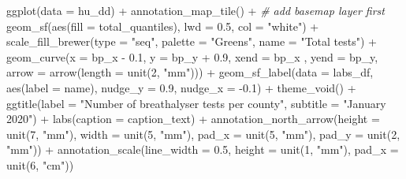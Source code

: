 \documentclass[
]{book}
\newenvironment{Shaded}{\begin{snugshade}}{\end{snugshade}}
\newcommand{\AttributeTok}[1]{\textcolor[rgb]{0.77,0.63,0.00}{#1}}
\newcommand{\CommentTok}[1]{\textcolor[rgb]{0.56,0.35,0.01}{\textit{#1}}}
\newcommand{\DecValTok}[1]{\textcolor[rgb]{0.00,0.00,0.81}{#1}}
\newcommand{\FloatTok}[1]{\textcolor[rgb]{0.00,0.00,0.81}{#1}}
\newcommand{\FunctionTok}[1]{\textcolor[rgb]{0.00,0.00,0.00}{#1}}
\newcommand{\NormalTok}[1]{#1}
\newcommand{\SpecialCharTok}[1]{\textcolor[rgb]{0.00,0.00,0.00}{#1}}
\newcommand{\StringTok}[1]{\textcolor[rgb]{0.31,0.60,0.02}{#1}}
\begin{document}
\begin{Shaded}
\begin{Highlighting}[]
\FunctionTok{ggplot}\NormalTok{(}\AttributeTok{data =}\NormalTok{ hu\_dd) }\SpecialCharTok{+} 
  \FunctionTok{annotation\_map\_tile}\NormalTok{() }\SpecialCharTok{+}  \CommentTok{\# add basemap layer first}
  \FunctionTok{geom\_sf}\NormalTok{(}\FunctionTok{aes}\NormalTok{(}\AttributeTok{fill =}\NormalTok{ total\_quantiles), }
          \AttributeTok{lwd =} \FloatTok{0.5}\NormalTok{, }\AttributeTok{col =} \StringTok{"white"}\NormalTok{) }\SpecialCharTok{+} 
  \FunctionTok{scale\_fill\_brewer}\NormalTok{(}\AttributeTok{type =} \StringTok{"seq"}\NormalTok{, }
                    \AttributeTok{palette =} \StringTok{"Greens"}\NormalTok{, }
                    \AttributeTok{name =} \StringTok{"Total tests"}\NormalTok{) }\SpecialCharTok{+} 
  \FunctionTok{geom\_curve}\NormalTok{(}\AttributeTok{x =}\NormalTok{ bp\_x }\SpecialCharTok{{-}} \FloatTok{0.1}\NormalTok{, }
             \AttributeTok{y =}\NormalTok{ bp\_y }\SpecialCharTok{+} \FloatTok{0.9}\NormalTok{, }
             \AttributeTok{xend =}\NormalTok{ bp\_x , }
             \AttributeTok{yend =}\NormalTok{ bp\_y, }
             \AttributeTok{arrow =} \FunctionTok{arrow}\NormalTok{(}\AttributeTok{length =} \FunctionTok{unit}\NormalTok{(}\DecValTok{2}\NormalTok{, }\StringTok{"mm"}\NormalTok{))) }\SpecialCharTok{+}
  \FunctionTok{geom\_sf\_label}\NormalTok{(}\AttributeTok{data =}\NormalTok{ labs\_df, }
                \FunctionTok{aes}\NormalTok{(}\AttributeTok{label =}\NormalTok{ name), }
                \AttributeTok{nudge\_y =} \FloatTok{0.9}\NormalTok{, }
                \AttributeTok{nudge\_x =} \SpecialCharTok{{-}}\FloatTok{0.1}\NormalTok{) }\SpecialCharTok{+} 
  \FunctionTok{theme\_void}\NormalTok{() }\SpecialCharTok{+} 
  \FunctionTok{ggtitle}\NormalTok{(}\AttributeTok{label =} \StringTok{"Number of breathalyser tests per county"}\NormalTok{, }
          \AttributeTok{subtitle =} \StringTok{"January 2020"}\NormalTok{) }\SpecialCharTok{+} 
  \FunctionTok{labs}\NormalTok{(}\AttributeTok{caption =}\NormalTok{ caption\_text) }\SpecialCharTok{+} 
  \FunctionTok{annotation\_north\_arrow}\NormalTok{(}\AttributeTok{height =} \FunctionTok{unit}\NormalTok{(}\DecValTok{7}\NormalTok{, }\StringTok{"mm"}\NormalTok{), }
                         \AttributeTok{width =} \FunctionTok{unit}\NormalTok{(}\DecValTok{5}\NormalTok{, }\StringTok{"mm"}\NormalTok{), }
                         \AttributeTok{pad\_x =} \FunctionTok{unit}\NormalTok{(}\DecValTok{5}\NormalTok{, }\StringTok{"mm"}\NormalTok{), }
                         \AttributeTok{pad\_y =} \FunctionTok{unit}\NormalTok{(}\DecValTok{2}\NormalTok{, }\StringTok{"mm"}\NormalTok{)) }\SpecialCharTok{+} 
  \FunctionTok{annotation\_scale}\NormalTok{(}\AttributeTok{line\_width =} \FloatTok{0.5}\NormalTok{, }
                   \AttributeTok{height =} \FunctionTok{unit}\NormalTok{(}\DecValTok{1}\NormalTok{, }\StringTok{"mm"}\NormalTok{), }
                   \AttributeTok{pad\_x =} \FunctionTok{unit}\NormalTok{(}\DecValTok{6}\NormalTok{, }\StringTok{"cm"}\NormalTok{)) }
\end{Highlighting}
\end{Shaded}
\end{document}
